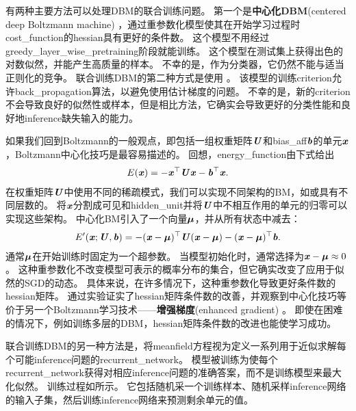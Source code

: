 
有两种主要方法可以处理\gls{DBM}的联合训练问题。
第一个是\textbf{中心化\gls{DBM}}(centered deep Boltzmann machine) \citep{Montavon2012}，通过重参数化模型使其在开始学习过程时\gls{cost_function}的\gls{hessian}具有更好的条件数。
这个模型不用经过\gls{greedy_layer_wise_pretraining}阶段就能训练。
这个模型在测试集上获得出色的对数似然，并能产生高质量的样本。
不幸的是，作为分类器，它仍然不能与适当正则化的竞争。
联合训练\gls{DBM}的第二种方式是使用 \citep{Goodfellow-et-al-NIPS2013}。
该模型的训练\gls{criterion}允许\gls{back_propagation}算法，以避免使用估计梯度的问题。
不幸的是，新的\gls{criterion}不会导致良好的似然性或样本，但是相比方法，它确实会导致更好的分类性能和良好地\gls{inference}缺失输入的能力。

如果我们回到\gls{Boltzmann}的一般观点，即包括一组权重矩阵$\boldsymbol{\mathit{U}}$和\gls{bias_aff}$\boldsymbol{\mathit{b}}$的单元$\boldsymbol{\mathit{x}}$，\gls{Boltzmann}中心化技巧是最容易描述的。
回想，\gls{energy_function}由下式给出
\begin{align}
 E(\boldsymbol{\mathit{x}}) = -\boldsymbol{\mathit{x}}^\top \boldsymbol{\mathit{U}} \boldsymbol{\mathit{x}} - \boldsymbol{\mathit{b}}^\top \boldsymbol{\mathit{x}}.
\end{align}
在权重矩阵$\boldsymbol{\mathit{U}}$中使用不同的稀疏模式，我们可以实现不同架构的\gls{BM}，如或具有不同层数的。
将$\boldsymbol{\mathit{x}}$分割成可见和\gls{hidden_unit}并将$\boldsymbol{\mathit{U}}$中不相互作用的单元的归零可以实现这些架构。
中心化\gls{BM}引入了一个向量$\boldsymbol{\mu}$，并从所有状态中减去：
\begin{align}
    E^{\prime}(\boldsymbol{\mathit{x}}; \boldsymbol{\mathit{U}}, \boldsymbol{\mathit{b}}) = -(\boldsymbol{\mathit{x}} - \boldsymbol{\mu})^\top \boldsymbol{\mathit{U}} (\boldsymbol{\mathit{x}} - \boldsymbol{\mu}) - (\boldsymbol{\mathit{x}} - \boldsymbol{\mu})^\top \boldsymbol{\mathit{b}}.
\end{align}
通常$\boldsymbol{\mu}$在开始训练时固定为一个超参数。
当模型初始化时，通常选择为$\boldsymbol{\mathit{x}} - \boldsymbol{\mu} \approx 0$。
这种重参数化不改变模型可表示的概率分布的集合，但它确实改变了应用于似然的\gls{SGD}的动态。
具体来说，在许多情况下，这种重参数化导致更好条件数的\gls{hessian}矩阵。
\citet{melchior2013center}通过实验证实了\gls{hessian}矩阵条件数的改善，并观察到中心化技巧等价于另一个\gls{Boltzmann}学习技术——\textbf{增强梯度}(enhanced gradient) \citep{ICML2011Cho_98-small}。
即使在困难的情况下，例如训练多层的\gls{DBM}，\gls{hessian}矩阵条件数的改进也能使学习成功。


联合训练\gls{DBM}的另一种方法是，将\gls{meanfield}方程视为定义一系列用于近似求解每个可能\gls{inference}问题的\gls{recurrent_network}\citep{Goodfellow-et-al-NIPS2013}。
模型被训练为使每个\gls{recurrent_network}获得对相应\gls{inference}问题的准确答案，而不是训练模型来最大化似然。
训练过程如所示。
它包括随机采一个训练样本、随机采样\gls{inference}网络的输入子集，然后训练\gls{inference}网络来预测剩余单元的值。

